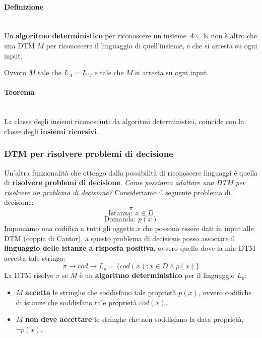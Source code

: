 \documentclass{article}
\begin{document}
\paragraph{Definizione}\mbox{}\\
Un \textbf{algoritmo deterministico} per riconoscere un insieme $A\subseteq\mathbb{N}$
non è altro che una DTM $M$ per riconoscere il linguaggio di quell'insieme, e che si arresta su ogni input.

Ovvero $M$ tale che $L_A=L_M$ e tale che $M$ si arresta su ogni input.

\paragraph{Teorema}\mbox{}\\
La classe degli insiemi riconosciuti da algoritmi deterministici, coincide con la classe
degli \textbf{insiemi ricorsivi}.

\subsubsection{DTM per risolvere problemi di decisione}
Un'altra funzionalità che ottengo dalla possibilità di riconoscere linguaggi è quella
di \textbf{risolvere problemi di decisione}.
\textit{Come possiamo adattare una DTM per risolvere un problema di decisione?} Consideriamo
il seguente problema di decisione:
$$\pi$$
$$\text{Istanza: } x\in D$$
$$\text{Domanda: }p(x)$$
Imponiamo una codifica a tutti gli oggetti $x$ che possono essere dati in input alle DTM
(coppia di Cantor), a questo problema di decisione posso associare il \textbf{linguaggio delle istanze
a risposta positiva}, ovvero quello dove la mia DTM accetta tale stringa:
$$\pi\rightarrow cod\rightarrow L_\pi=\{cod(x):x\in D\land p(x)\}$$
La DTM risolve $\pi$ se $M$ è un \textbf{algoritmo deterministico} per il linguaggio $L_\pi$:
\begin{itemize}
    \item $M$ \textbf{accetta} le stringhe che soddisfano tale proprietà $p(x)$,
          ovvero codifiche di istanze che soddisfano tale proprietà $cod(x)$.

    \item $M$ \textbf{non deve accettare} le stringhe che non soddisfano la data proprietà,$\lnot p(x)$.
\end{itemize}
\end{document}
